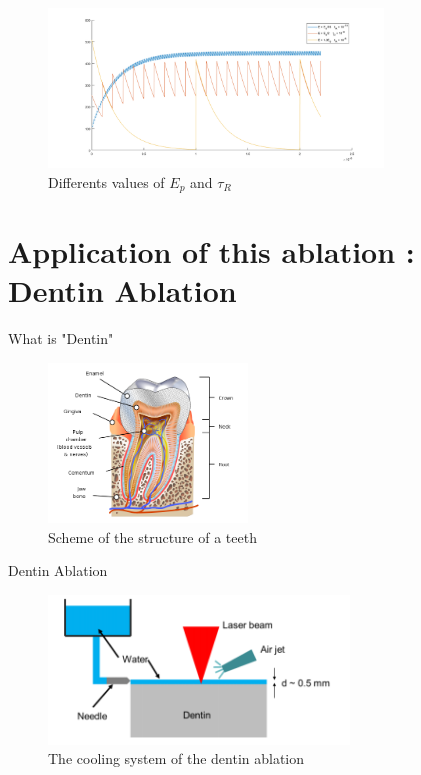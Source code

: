 \documentclass[11pt]{beamer}
\begin{document}
\begin{frame}

\begin{figure}[H]
\centering
\includegraphics[height=160px]{temperature_evolution_of_the_impact_point_2.png}
\caption{Differents values of $E_p$ and $\tau_R$}
\end{figure}

\end{frame}

\section{Application of this ablation : Dentin Ablation}
\begin{frame}{What is "Dentin"}

\begin{figure}[H]
\centering
\includegraphics[height=160px]{dentine.png}
\caption{Scheme of the structure of a teeth}
\end{figure}

\end{frame}

\begin{frame}{Dentin Ablation}

\begin{figure}[H]
\centering
\includegraphics[height=150px]{cooling_system.png}
\caption{The cooling system of the dentin ablation}
\end{figure}


\end{frame}
\end{document}
